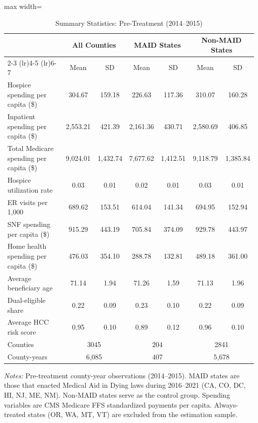 \begin{table}[H]
\centering
\caption{Summary Statistics: Pre-Treatment (2014--2015)}
\label{tab:summary}
\begin{adjustbox}{max width=\textwidth}
\begin{threeparttable}
\begin{tabular}{lcccccc}
\toprule
& \multicolumn{2}{c}{All Counties} & \multicolumn{2}{c}{MAID States} & \multicolumn{2}{c}{Non-MAID States} \\
\cmidrule(lr){2-3} \cmidrule(lr){4-5} \cmidrule(lr){6-7}
& Mean & SD & Mean & SD & Mean & SD \\
\midrule
Hospice spending per capita (\$) & 304.67 & 159.18 & 226.63 & 117.36 & 310.07 & 160.28 \\
Inpatient spending per capita (\$) & 2,553.21 & 421.39 & 2,161.36 & 430.71 & 2,580.69 & 406.85 \\
Total Medicare spending per capita (\$) & 9,024.01 & 1,432.74 & 7,677.62 & 1,412.51 & 9,118.79 & 1,385.84 \\
Hospice utilization rate & 0.03 & 0.01 & 0.02 & 0.01 & 0.03 & 0.01 \\
ER visits per 1,000 & 689.62 & 153.51 & 614.04 & 141.34 & 694.95 & 152.94 \\
\midrule
SNF spending per capita (\$) & 915.29 & 443.19 & 705.84 & 374.09 & 929.78 & 443.97 \\
Home health spending per capita (\$) & 476.03 & 354.10 & 288.78 & 132.81 & 489.18 & 361.00 \\
Average beneficiary age & 71.14 & 1.94 & 71.26 & 1.59 & 71.13 & 1.96 \\
Dual-eligible share & 0.22 & 0.09 & 0.23 & 0.10 & 0.22 & 0.09 \\
Average HCC risk score & 0.95 & 0.10 & 0.89 & 0.12 & 0.96 & 0.10 \\
\midrule
Counties & \multicolumn{2}{c}{3045} & \multicolumn{2}{c}{204} & \multicolumn{2}{c}{2841} \\
County-years & \multicolumn{2}{c}{6,085} & \multicolumn{2}{c}{407} & \multicolumn{2}{c}{5,678} \\
\bottomrule
\end{tabular}
\begin{tablenotes}[flushleft]
\scriptsize
\item \textit{Notes:} Pre-treatment county-year observations (2014--2015). MAID states are those that enacted Medical Aid in Dying laws during 2016--2021 (CA, CO, DC, HI, NJ, ME, NM). Non-MAID states serve as the control group. Spending variables are CMS Medicare FFS standardized payments per capita. Always-treated states (OR, WA, MT, VT) are excluded from the estimation sample.
\end{tablenotes}
\end{threeparttable}
\end{adjustbox}
\end{table}
